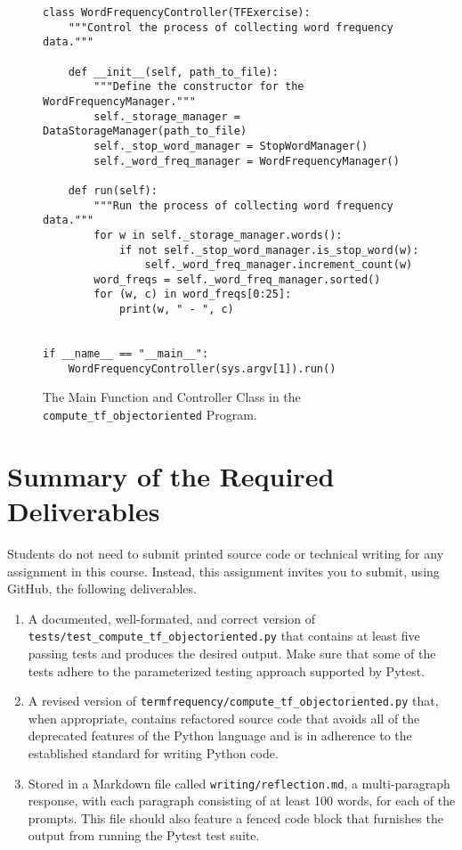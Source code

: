 \documentclass[11pt]{article}
\newcommand{\mainprogramsource}{\lstinline{termfrequency/compute_tf_objectoriented.py}}
\newcommand{\testprogramsource}{\lstinline{tests/test_compute_tf_objectoriented.py}}
\newcommand{\reflection}{\lstinline{writing/reflection.md}}
\begin{document}
\begin{figure}[t]
%
\begin{verbatim}
class WordFrequencyController(TFExercise):
    """Control the process of collecting word frequency data."""

    def __init__(self, path_to_file):
        """Define the constructor for the WordFrequencyManager."""
        self._storage_manager = DataStorageManager(path_to_file)
        self._stop_word_manager = StopWordManager()
        self._word_freq_manager = WordFrequencyManager()

    def run(self):
        """Run the process of collecting word frequency data."""
        for w in self._storage_manager.words():
            if not self._stop_word_manager.is_stop_word(w):
                self._word_freq_manager.increment_count(w)
        word_freqs = self._word_freq_manager.sorted()
        for (w, c) in word_freqs[0:25]:
            print(w, " - ", c)


if __name__ == "__main__":
    WordFrequencyController(sys.argv[1]).run()
\end{verbatim}
%
\vspace*{-.15in}
%
\caption{The Main Function and Controller Class in the {\tt compute\_tf\_objectoriented} Program.}\label{fig:main}
%
\vspace*{-.1in}
%
\end{figure}

\section*{Summary of the Required Deliverables}

\noindent Students do not need to submit printed source code or technical
writing for any assignment in this course. Instead, this assignment invites you
to submit, using GitHub, the following deliverables.

\vspace*{-.25em}

\begin{enumerate}

\setlength{\itemsep}{0in}

\item A documented, well-formated, and correct version of \testprogramsource{}
  that contains at least five passing tests and produces the desired output.
  Make sure that some of the tests adhere to the parameterized testing approach
  supported by Pytest.

\item A revised version of \mainprogramsource{} that, when appropriate, contains
  refactored source code that avoids all of the deprecated features of the
  Python language and is in adherence to the established standard for writing
  Python code.

\item Stored in a Markdown file called \reflection{}, a multi-paragraph
  response, with each paragraph consisting of at least 100 words, for each of
  the prompts. This file should also feature a fenced code block that furnishes
  the output from running the Pytest test suite.

\end{enumerate}
\end{document}
